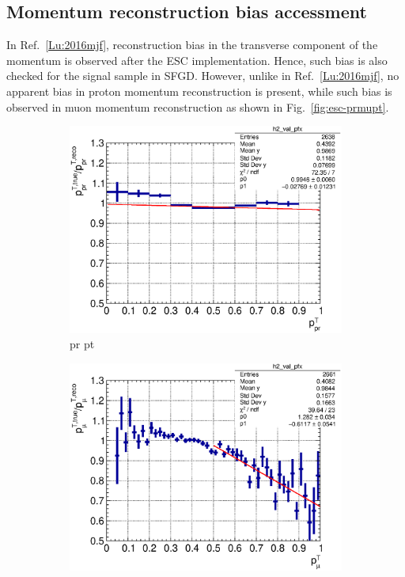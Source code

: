     \subsection{Momentum reconstruction bias accessment}
    In Ref.~\ref{Lu:2016mjf}, reconstruction bias in the transverse component of the momentum is observed after the ESC implementation.
    Hence, such bias is also checked for the signal sample in SFGD.
    However, unlike in Ref.~\ref{Lu:2016mjf}, no apparent bias in proton momentum reconstruction is present, while such bias is observed in muon momentum reconstruction as shown in Fig.~\ref{fig:esc-prmupt}.
     \begin{figure}
        \centering
        \begin{subfigure}[b]{\dbfigwid\textwidth}
             \centering
             \includegraphics[width=\textwidth]{figures/sel/pr_pt_vs_pr_pt_bias_hist2d_al14.eps}
             \caption{pr pt}
             \label{subfig:esc-prpt}
        \end{subfigure}
        \begin{subfigure}[b]{\dbfigwid\textwidth}
             \centering
             \includegraphics[width=\textwidth]{figures/sel/mu_pt_vs_mu_pt_bias_hist2d_al14.eps}

\end{subfigure}
\end{figure}
